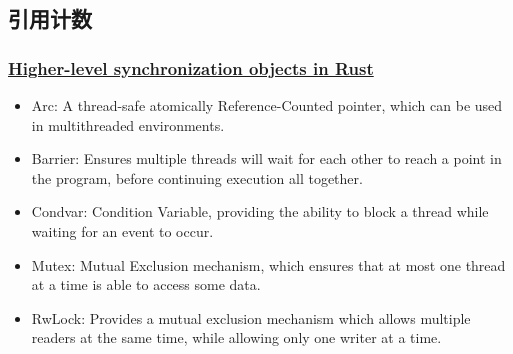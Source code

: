 \subsection{引用计数} %
\begin{frame}[fragile]
    \frametitle{\href{https://doc.rust-lang.org/std/sync/index.html}{Higher-level synchronization objects in Rust}}

    \begin{itemize}
        \item Arc: A thread-safe atomically Reference-Counted pointer, which can be used in multithreaded environments. \pause
        \item Barrier: Ensures multiple threads will wait for each other to reach a point in the program, before continuing execution all together. \pause
        \item Condvar: Condition Variable, providing the ability to block a thread while waiting for an event to occur. \pause
        \item Mutex: Mutual Exclusion mechanism, which ensures that at most one thread at a time is able to access some data. \pause
        \item RwLock: Provides a mutual exclusion mechanism which allows multiple readers at the same time, while allowing only one writer at a time.
    \end{itemize}


\end{frame}
% 
% 
% 
% 
% 
% 
% 
